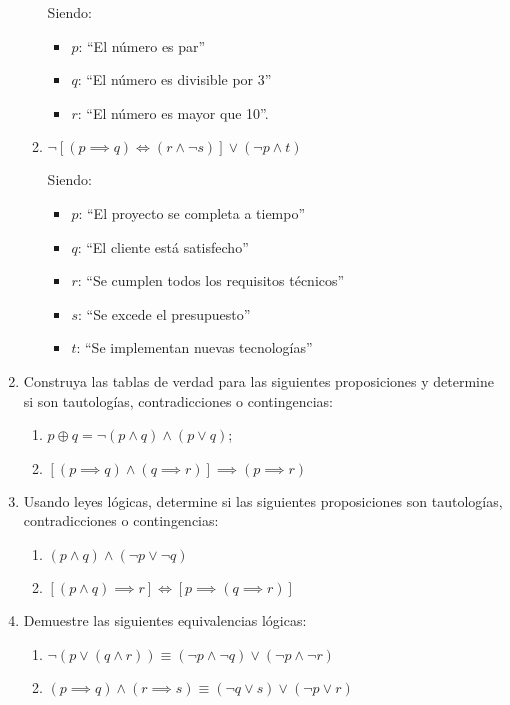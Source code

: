 \begin{enumerate}[label=\textbf{\arabic*}.]
\begin{enumerate}[label=\alph*)]
		Siendo:
		\begin{itemize}[itemsep=-3pt]
			\item $p$: ``El número es par''
			\item $q$: ``El número es divisible por 3''
			\item $r$: ``El número es mayor que 10''.
		\end{itemize}
		
		\item $\neg [(p \implies q) \iff (r \land \neg s)] \lor (\neg p \land t)$
		
		Siendo:
		\begin{itemize}[itemsep=-3pt]
			\item $p$: ``El proyecto se completa a tiempo''
			\item $q$: ``El cliente está satisfecho''
			\item $r$: ``Se cumplen todos los requisitos técnicos''
			\item $s$: ``Se excede el presupuesto''
			\item $t$: ``Se implementan nuevas tecnologías''
		\end{itemize}
	\end{enumerate}
	\item Construya las tablas de verdad para las siguientes proposiciones y determine si son tautologías, contradicciones o contingencias:
	\begin{enumerate}[label=\alph*)]
		\item $p \oplus q = \neg (p \land q) \land (p \lor q)$;
		\item $\left[(p \implies q) \land (q \implies r)\right] \implies (p \implies r)$
	\end{enumerate}
	
	\item Usando leyes lógicas, determine si las siguientes proposiciones son tautologías, contradicciones o contingencias:
	\begin{enumerate}
		\item \( (p \land q) \land (\neg p \lor \neg q) \)
		\item $\left[ (p \land q) \implies r \right] \iff \left[p \implies (q \implies r)\right]$
	\end{enumerate}
	
	\item Demuestre las siguientes equivalencias lógicas:
	\begin{enumerate}[label=\alph*)]
		\item $ \neg(p \lor (q \land r)) \equiv (\neg p \land \neg q) \lor (\neg p \land \neg r)$
		\item $(p \implies q) \land (r \implies s) \equiv (\neg q \lor s) \lor (\neg p \lor r)$
	\end{enumerate}
	

\end{enumerate}
